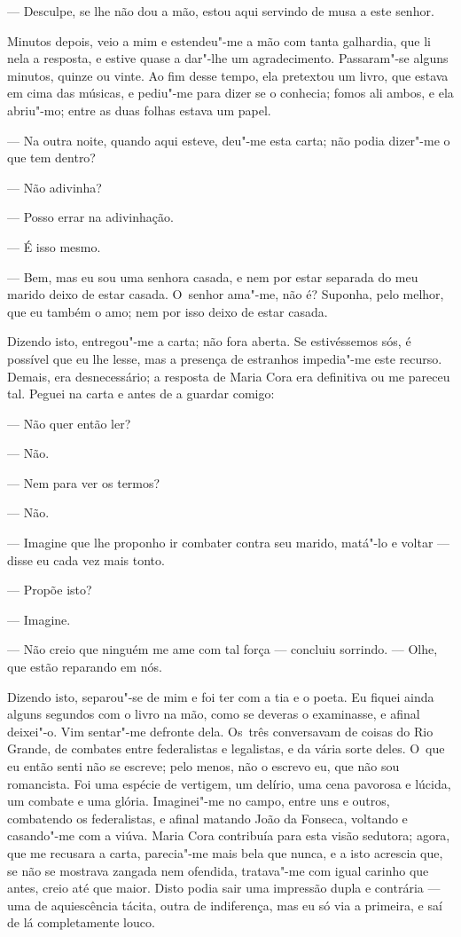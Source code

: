 \begin{linenumbers}
--- Desculpe, se lhe não dou a mão, estou aqui servindo de musa a este
senhor.

Minutos depois, veio a mim e estendeu"-me a mão com tanta galhardia, que
li nela a resposta, e estive quase a dar"-lhe um agradecimento.
Passaram"-se alguns minutos, quinze ou vinte. Ao fim desse tempo, ela
pretextou um livro, que estava em cima das músicas, e pediu"-me para
dizer se o conhecia; fomos ali ambos, e ela abriu"-mo; entre as duas
folhas estava um papel.

--- Na outra noite, quando aqui esteve, deu"-me esta carta; não podia
dizer"-me o que tem dentro?

--- Não adivinha?

--- Posso errar na adivinhação.

--- É isso mesmo.

--- Bem, mas eu sou uma senhora casada, e nem por estar separada do meu
marido deixo de estar casada. O~senhor ama"-me, não é? Suponha, pelo
melhor, que eu também o amo; nem por isso deixo de estar casada.

Dizendo isto, entregou"-me a carta; não fora aberta. Se estivéssemos sós,
é possível que eu lhe lesse, mas a presença de estranhos impedia"-me este
recurso. Demais, era desnecessário; a resposta de Maria Cora era
definitiva ou me pareceu tal. Peguei na carta e antes de a guardar
comigo:

--- Não quer então ler?

--- Não.

--- Nem para ver os termos?

--- Não.

--- Imagine que lhe proponho ir combater contra seu marido, matá"-lo e
voltar --- disse eu cada vez mais tonto.

--- Propõe isto?

--- Imagine.

--- Não creio que ninguém me ame com tal força --- concluiu sorrindo. ---
Olhe, que estão reparando em nós.

Dizendo isto, separou"-se de mim e foi ter com a tia e o poeta. Eu fiquei
ainda alguns segundos com o livro na mão, como se deveras o examinasse,
e afinal deixei"-o. Vim sentar"-me defronte dela. Os~três conversavam de
coisas do Rio Grande, de combates entre federalistas e legalistas, e da
vária sorte deles. O~que eu então senti não se escreve; pelo menos, não
o escrevo eu, que não sou romancista. Foi uma espécie de vertigem, um
delírio, uma cena pavorosa e lúcida, um combate e uma glória.
Imaginei"-me no campo, entre uns e outros, combatendo os federalistas, e
afinal matando João da Fonseca, voltando e casando"-me com a viúva. Maria
Cora contribuía para esta visão sedutora; agora, que me recusara a
carta, parecia"-me mais bela que nunca, e a isto acrescia que, se não se
mostrava zangada nem ofendida, tratava"-me com igual carinho que antes,
creio até que maior. Disto podia sair uma impressão dupla e contrária ---
uma de aquiescência tácita, outra de indiferença, mas eu só via a
primeira, e saí de lá completamente louco.


\end{linenumbers}
